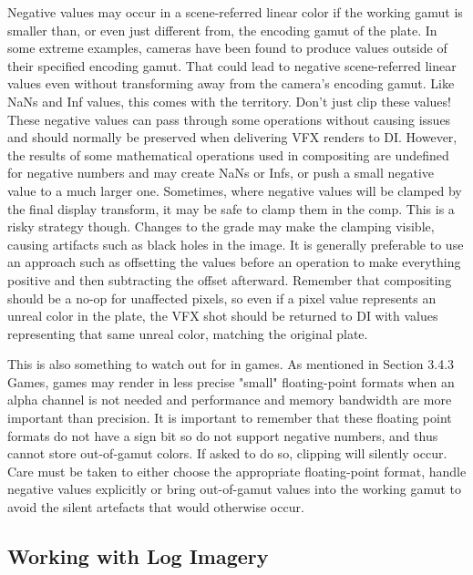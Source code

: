Negative values may occur in a scene-referred linear color if the working gamut is smaller than, or even just different from, the encoding gamut of the plate. In some extreme examples, cameras have been found to produce values outside of their specified encoding gamut. That could lead to negative scene-referred linear values even without transforming away from the camera's encoding gamut. Like NaNs and Inf values, this comes with the territory. Don't just clip these values! These negative values can pass through some operations without causing issues and should normally be preserved when delivering VFX renders to DI. However, the results of some mathematical operations used in compositing are undefined for negative numbers and may create NaNs or Infs, or push a small negative value to a much larger one. Sometimes, where negative values will be clamped by the final display transform, it may be safe to clamp them in the comp. This is a risky strategy though. Changes to the grade may make the clamping visible, causing artifacts such as black holes in the image. It is generally preferable to use an approach such as offsetting the values before an operation to make everything positive and then subtracting the offset afterward. Remember that compositing should be a no-op for unaffected pixels, so even if a pixel value represents an unreal color in the plate, the VFX shot should be returned to DI with values representing that same unreal color, matching the original plate.

This is also something to watch out for in games. As mentioned in Section 3.4.3 Games, games may render in less precise "small" floating-point formats when an alpha channel is not needed and performance and memory bandwidth are more important than precision. It is important to remember that these floating point formats do not have a sign bit so do not support negative numbers, and thus cannot store out-of-gamut colors. If asked to do so, clipping will silently occur. Care must be taken to either choose the appropriate floating-point format, handle negative values explicitly or bring out-of-gamut values into the working gamut to avoid the silent artefacts that would otherwise occur.

\subsection{Working with Log Imagery}%
\label{subsec:working-with-log-imagery}




